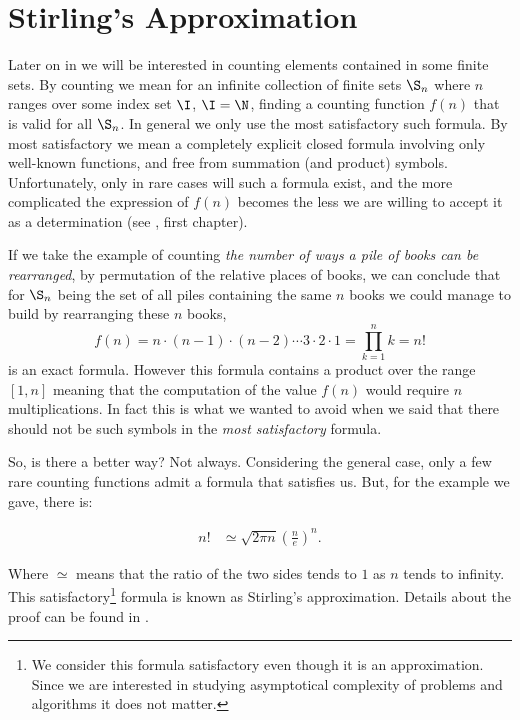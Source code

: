 \section{Stirling's Approximation}
\label{tree:sorting:stirling}

Later on in  we will be interested in counting elements
contained in some
finite sets. By counting we mean for an infinite collection of finite sets
$\S_n$ where $n$ ranges over some index set $\I$, \eg $\I = \N$, finding a
counting function $f(n)$ that is valid for all $\S_n$. In general we only
use the most satisfactory such formula. By most satisfactory we mean a
completely explicit closed formula involving only well-known functions, and
free from summation (and product) symbols. Unfortunately, only in rare cases
will such a formula exist, and the more complicated the expression of $f(n)$
becomes the less we are willing to accept it as a determination
(see \citet*{Stanley:2011:ECV:2124415}, first chapter).

If we take the example of counting \emph{the number of ways a pile of books can
be rearranged}, \ie by permutation of the relative places of books, we can
conclude that for $\S_n$ being the set of all piles containing the same $n$
books we could manage to build by rearranging these $n$ books,
\begin{displaymath}
f(n) = n \cdot (n-1) \cdot (n-2) \cdots 3 \cdot 2 \cdot 1 = \prod_{k=1}^n k = n!
\end{displaymath}
is an exact formula. However this formula contains a product over the range
$[1, n]$ meaning that the computation of the value $f(n)$ would require $n$
multiplications. In fact this is what we wanted to avoid when we said that
there should not be such symbols in the \emph{most satisfactory} formula.

So, is there a better way? Not always. Considering the general case, only a few
rare counting functions admit a formula that satisfies us. But, for
the example we gave, there is:
\begin{theorem}
\label{tree:sorting:theorem/stirling}
\begin{align*}
n! &\simeq \sqrt{2 \pi n} \left(\frac{n}{e}\right)^n.
\end{align*}
\end{theorem}
Where \(\simeq\) means that the ratio of the two sides tends to \(1\) as \(n\)
tends to infinity.
This satisfactory\footnote{We consider this formula satisfactory even though it is
an approximation. Since we are interested in studying asymptotical complexity
of problems and algorithms it does not matter.} formula is known as Stirling's approximation. Details
about the proof can be found in \citet*{feller1967direct}.

